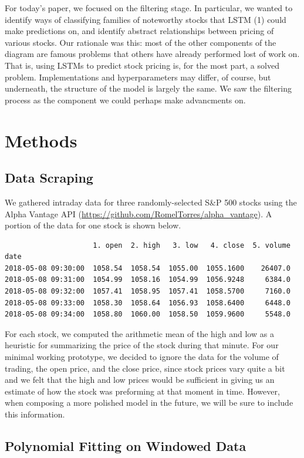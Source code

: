 \documentclass[final]{article}
\begin{document}
For today's paper, we focused on the filtering stage. In particular,
we wanted to identify ways of classifying families of noteworthy
stocks that LSTM (1) could make predictions on, and identify abstract
relationships between pricing of various stocks. Our rationale was
this: most of the other components of the diagram are famous problems
that others have already performed lost of work on. That is, using
LSTMs to predict stock pricing is, for the most part, a solved
problem. Implementations and hyperparameters may differ, of course,
but underneath, the structure of the model is largely the same. We saw
the filtering process as the component we could perhaps make
advancments on.
\section{Methods}

\subsection{Data Scraping}
We gathered intraday data for three randomly-selected S\&P 500 stocks
using the Alpha Vantage API
(\url{https://github.com/RomelTorres/alpha_vantage}). A portion of the
data for one stock is shown below.

\begin{verbatim}
                     1. open  2. high   3. low   4. close  5. volume
date
2018-05-08 09:30:00  1058.54  1058.54  1055.00  1055.1600    26407.0
2018-05-08 09:31:00  1054.99  1058.16  1054.99  1056.9248     6384.0
2018-05-08 09:32:00  1057.41  1058.95  1057.41  1058.5700     7160.0
2018-05-08 09:33:00  1058.30  1058.64  1056.93  1058.6400     6448.0
2018-05-08 09:34:00  1058.80  1060.00  1058.50  1059.9600     5548.0
\end{verbatim}

For each stock, we computed the arithmetic mean of the high and low as
a heuristic for summarizing the price of the stock during that minute.
For our minimal working prototype, we decided to ignore the data for
the volume of trading, the open price, and the close price, since
stock prices vary quite a bit and we felt that the high and low prices
would be sufficient in giving us an estimate of how the stock was
preforming at that moment in time. However, when composing a more
polished model in the future, we will be sure to include this
information.

\subsection{Polynomial Fitting on Windowed Data}
\end{document}
